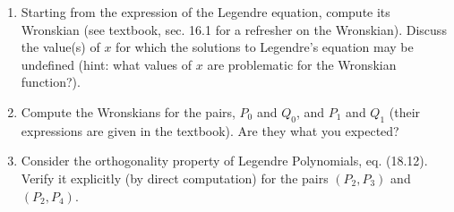 \documentclass[fleqn]{article}
\begin{document}
\begin{enumerate}
    \item Starting from the expression of the Legendre equation, compute its Wronskian (see textbook, sec. 16.1 for a refresher on the Wronskian). Discuss the value(s) of $x$ for which the solutions to Legendre's equation may be undefined (hint: what values of $x$ are problematic for the Wronskian function?).
    
    
    \item Compute the Wronskians for the pairs, $P_0$ and $Q_0$, and $P_1$ and $Q_1$ (their expressions are given in the textbook). Are they what you expected?
    
    
    \item Consider the orthogonality property of Legendre Polynomials, eq. (18.12). Verify it explicitly (by direct computation) for the pairs $(P_2,P_3 )$ and $(P_2,P_4)$. 
    
  \end{enumerate}
\end{document}
